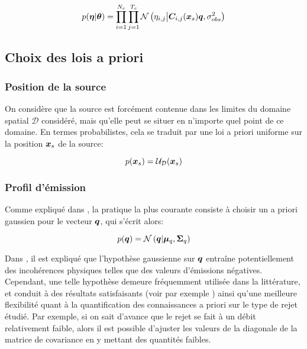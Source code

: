\begin{equation}
p({\bm{\eta}} | {\bm{\theta}}) = \prod\limits_{i=1}^{N_c} \prod\limits_{j=1}^{T_c}\mathcal{N}\left({\eta}_{i,j} \middle\vert {\bm{C}}_{i,j}({\bm{x}_s}){\bm{q}}, {\sigma_{obs}^2}\right)
\label{eq_AE_5}
\end{equation}

\subsection{Choix des lois a priori}

\subsubsection{Position de la source}

On considère que la source est forcément contenue dans les limites du domaine spatial $\mathcal{D}$ considéré, mais qu'elle peut se situer en n'importe quel point de ce domaine. En termes probabilistes, cela se traduit par une loi a priori uniforme sur la position ${\bm{x}_s}$ de la source:

\begin{equation}
p({\bm{x}_s}) = \mathcal{U}_\mathcal{D}({\bm{x}_s})
\label{eq_AE_7}
\end{equation}


\subsubsection{Profil d'émission}

Comme expliqué dans \cite{Winiarek2011}, la pratique la plus courante consiste à choisir un a priori gaussien pour le vecteur ${\bm{q}}$, qui s'écrit alors:

\begin{equation}
p({\bm{q}}) = \mathcal{N}\left({\bm{q}} \middle \vert {\bm{\mu}_q}, {\bm{\Sigma}_q}\right)
\label{eq_AE_8}
\end{equation}

Dans \cite{Bocquet2008}, il est expliqué que l'hypothèse gaussienne sur ${\bm{q}}$ entraîne potentiellement des incohérences physiques telles que des valeurs d'émissions négatives. Cependant, une telle hypothèse demeure fréquemment utilisée dans la littérature, et conduit à des résultats satisfaisants (voir par exemple \cite{Issartel2003}) ainsi qu'une meilleure flexibilité quant à la quantification des connaissances a priori sur le type de rejet étudié. Par exemple, si on sait d'avance que le rejet se fait à un débit relativement faible, alors il est possible d'ajuster les valeurs de la diagonale de la matrice de covariance en y mettant des quantités faibles. \\

